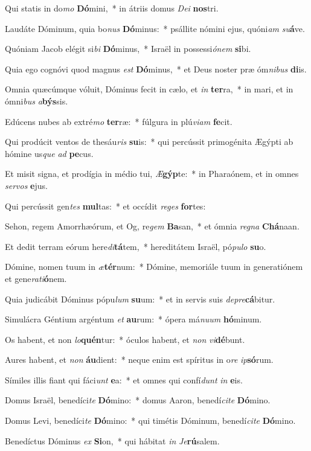 \item Qui statis in do\textit{mo} \textbf{Dó}mini,~* in átriis domus \textit{De}\textit{i} \textbf{nos}tri.
\item Laudáte Dóminum, quia bo\textit{nus} \textbf{Dó}minus:~* psállite nómini ejus, quóni\textit{am} \textit{su}\textbf{á}ve.
\item Quóniam Jacob elégit si\textit{bi} \textbf{Dó}minus,~* Israël in possessi\textit{ó}\textit{nem} \textbf{si}bi.
\item Quia ego cognóvi quod magnus \textit{est} \textbf{Dó}minus,~* et Deus noster præ óm\textit{ni}\textit{bus} \textbf{di}is.
\item Omnia quæcúmque vóluit, Dóminus fecit in cælo, et \textit{in} \textbf{ter}ra,~* in mari, et in ómni\textit{bus} \textit{a}\textbf{býs}sis.
\item Edúcens nubes ab extré\textit{mo} \textbf{ter}ræ:~* fúlgura in plú\textit{vi}\textit{am} \textbf{fe}cit.
\item Qui prodúcit ventos de thesáu\textit{ris} \textbf{su}is:~* qui percússit primogénita Ægýpti ab hómine us\textit{que} \textit{ad} \textbf{pe}cus.
\item Et misit signa, et prodígia in médio tui, \textit{Æ}\textbf{gýp}te:~* in Pharaónem, et in omnes \textit{ser}\textit{vos} \textbf{e}jus.
\item Qui percússit gen\textit{tes} \textbf{mul}tas:~* et occídit \textit{re}\textit{ges} \textbf{for}tes:
\item Sehon, regem Amorrhæórum, et Og, re\textit{gem} \textbf{Ba}san,~* et ómnia \textit{re}\textit{gna} \textbf{Chá}naan.
\item Et dedit terram eórum here\textit{di}\textbf{tá}tem,~* hereditátem Israël, pó\textit{pu}\textit{lo} \textbf{su}o.
\item Dómine, nomen tuum in \textit{æ}\textbf{tér}num:~* Dómine, memoriále tuum in generatiónem et gene\textit{ra}\textit{ti}\textbf{ó}nem.
\item Quia judicábit Dóminus pópu\textit{lum} \textbf{su}um:~* et in servis suis \textit{de}\textit{pre}\textbf{cá}bitur.
\item Simulácra Géntium argéntum \textit{et} \textbf{au}rum:~* ópera má\textit{nu}\textit{um} \textbf{hó}minum.
\item Os habent, et non \textit{lo}\textbf{quén}tur:~* óculos habent, et \textit{non} \textit{vi}\textbf{dé}bunt.
\item Aures habent, et \textit{non} \textbf{áu}dient:~* neque enim est spíritus in o\textit{re} \textit{ip}\textbf{só}rum.
\item Símiles illis fiant qui fáci\textit{unt} \textbf{e}a:~* et omnes qui confí\textit{dunt} \textit{in} \textbf{e}is.
\item Domus Israël, benedíci\textit{te} \textbf{Dó}mino:~* domus Aaron, benedí\textit{ci}\textit{te} \textbf{Dó}mino.
\item Domus Levi, benedíci\textit{te} \textbf{Dó}mino:~* qui timétis Dóminum, benedí\textit{ci}\textit{te} \textbf{Dó}mino.
\item Benedíctus Dóminus \textit{ex} \textbf{Si}on,~* qui hábitat \textit{in} \textit{Je}\textbf{rú}salem.
